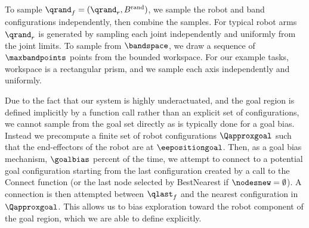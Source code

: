To sample $\qrand_f = (\qrand_r,B^\textrm{rand})$, we sample the robot and band configurations independently, then combine the samples. For typical robot arms $\qrand_r$ is generated by sampling each joint independently and uniformly from the joint limits. To sample from $\bandspace$, we draw a sequence of $\maxbandpoints$ points from the bounded workspace. For our example tasks, workspace is a rectangular prism, and we sample each axis independently and uniformly.

Due to the fact that our system is highly underactuated, and the goal region is defined implicitly by a function call rather than an explicit set of configurations, we cannot sample from the goal set directly as is typically done for a goal bias. Instead we precompute a finite set of robot configurations $\Qapproxgoal$ such that the end-effectors of the robot are at $\eepositiongoal$. Then, as a goal bias mechanism, $\goalbias$ percent of the time, we attempt to connect to a potential goal configuration starting from the last configuration created by a call to the Connect function (or the last node selected by BestNearest if $\nodesnew = \emptyset$). A connection is then attempted between $\qlast_f$ and the nearest configuration in $\Qapproxgoal$. This allows us to bias exploration toward the robot component of the goal region, which we are able to define explicitly.








